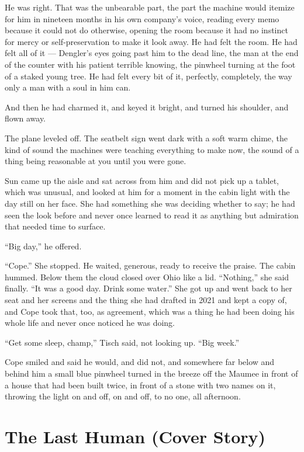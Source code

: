 \documentclass[11pt,openany]{book}
\begin{document}
He was right. That was the unbearable part, the part the machine would itemize for him in nineteen months in his own company's voice, reading every memo because it could not do otherwise, opening the room because it had no instinct for mercy or self-preservation to make it look away. He had felt the room. He had felt all of it --- Dengler's eyes going past him to the dead line, the man at the end of the counter with his patient terrible knowing, the pinwheel turning at the foot of a staked young tree. He had felt every bit of it, perfectly, completely, the way only a man with a soul in him can.

And then he had charmed it, and keyed it bright, and turned his shoulder, and flown away.

The plane leveled off. The seatbelt sign went dark with a soft warm chime, the kind of sound the machines were teaching everything to make now, the sound of a thing being reasonable at you until you were gone.

Sun came up the aisle and sat across from him and did not pick up a tablet, which was unusual, and looked at him for a moment in the cabin light with the day still on her face. She had something she was deciding whether to say; he had seen the look before and never once learned to read it as anything but admiration that needed time to surface.

``Big day,'' he offered.

``Cope.'' She stopped. He waited, generous, ready to receive the praise. The cabin hummed. Below them the cloud closed over Ohio like a lid. ``Nothing,'' she said finally. ``It was a good day. Drink some water.'' She got up and went back to her seat and her screens and the thing she had drafted in 2021 and kept a copy of, and Cope took that, too, as agreement, which was a thing he had been doing his whole life and never once noticed he was doing.

``Get some sleep, champ,'' Tisch said, not looking up. ``Big week.''

Cope smiled and said he would, and did not, and somewhere far below and behind him a small blue pinwheel turned in the breeze off the Maumee in front of a house that had been built twice, in front of a stone with two names on it, throwing the light on and off, on and off, to no one, all afternoon.

\clearpage
\chapter{The Last Human (Cover Story)}
\end{document}
